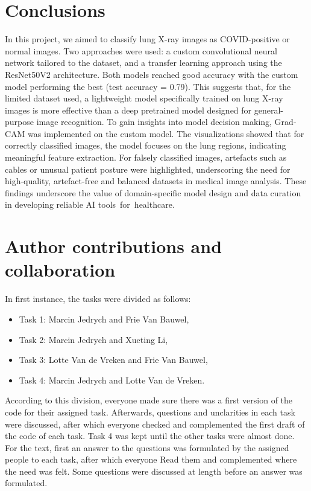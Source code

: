 \documentclass[conference]{IEEEtran}
\begin{document}
\section{Conclusions}\label{sec:conclusion}

In this project, we aimed to classify lung X-ray images as COVID-positive or normal images. Two approaches were used: a custom convolutional neural network tailored to the dataset, and a transfer learning approach using the ResNet50V2 architecture. Both models reached good accuracy with the custom model performing the best (test accuracy = 0.79). This suggests that, for the limited dataset used, a lightweight model specifically trained on lung X-ray images is more effective than a deep pretrained model designed for general-purpose image recognition. To gain insights into model decision making, Grad-CAM was implemented on the custom model. The visualizations showed that for correctly classified images, the model focuses on the lung regions, indicating meaningful feature extraction. For falsely classified images, artefacts such as cables or unusual patient posture were highlighted, underscoring the need for high-quality, artefact-free and balanced datasets in medical image analysis. These findings underscore the value of domain-specific model design and data curation in developing reliable AI tools for healthcare.

\section{Author contributions and collaboration}\label{sec:author_contributions}
In first instance, the tasks were divided as follows:
\begin{itemize}
	\item Task 1: Marcin Jedrych and Frie Van Bauwel, 
	\item Task 2: Marcin Jedrych and Xueting Li,
	\item Task 3: Lotte Van de Vreken and Frie Van Bauwel,
	\item Task 4: Marcin Jedrych and Lotte Van de Vreken.
\end{itemize}

According to this division, everyone made sure there was a first version of the code for their assigned task. Afterwards, questions and unclarities in each task were discussed, after which everyone checked and complemented the first draft of the code of each task. Task 4 was kept until the other tasks were almost done. For the text, first an answer to the questions was formulated by the assigned people to each task, after which everyone Read them and complemented where the need was felt. Some questions were discussed at length before an answer was formulated.
\end{document}
